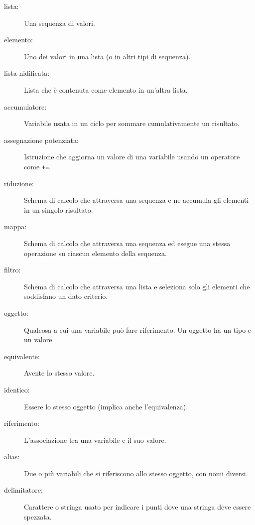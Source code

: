 \documentclass[10pt]{book}
\begin{document}
\begin{description}

\item[lista:] Una sequenza di valori.

\item[elemento:] Uno dei valori in una lista (o in altri tipi di sequenza).

\item[lista nidificata:] Lista che è contenuta come elemento in un'altra lista.

\item[accumulatore:] Variabile usata in un ciclo per sommare cumulativamente un risultato.

\item[assegnazione potenziata:] Istruzione che aggiorna un valore di una variabile usando un operatore come \verb"+=".

\item[riduzione:] Schema di calcolo che attraversa una sequenza e ne accumula gli elementi in un singolo risultato.

\item[mappa:] Schema di calcolo che attraversa una sequenza ed esegue una stessa operazione su ciascun elemento della sequenza.

\item[filtro:] Schema di calcolo che attraversa una lista e seleziona solo gli elementi che soddisfano un dato criterio.

\item[oggetto:] Qualcosa a cui una variabile può fare riferimento. Un oggetto ha un tipo e un valore.

\item[equivalente:] Avente lo stesso valore.

\item[identico:] Essere lo stesso oggetto (implica anche l'equivalenza).

\item[riferimento:] L'associazione tra una variabile e il suo valore.

\item[alias:] Due o più variabili che si riferiscono allo stesso oggetto, con nomi diversi.

\item[delimitatore:] Carattere o stringa usato per indicare i punti dove una stringa deve essere spezzata.

\end{description}
\end{document}
